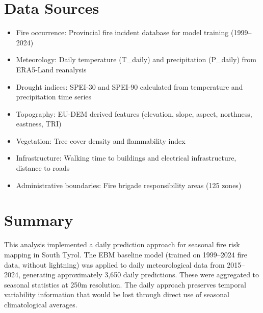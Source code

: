 \documentclass[11pt,a4paper]{article}
\begin{document}
\section{Data Sources}

\begin{itemize}
    \item Fire occurrence: Provincial fire incident database for model training (1999--2024)
    \item Meteorology: Daily temperature (T\_daily) and precipitation (P\_daily) from ERA5-Land reanalysis
    \item Drought indices: SPEI-30 and SPEI-90 calculated from temperature and precipitation time series
    \item Topography: EU-DEM derived features (elevation, slope, aspect, northness, eastness, TRI)
    \item Vegetation: Tree cover density and flammability index
    \item Infrastructure: Walking time to buildings and electrical infrastructure, distance to roads
    \item Administrative boundaries: Fire brigade responsibility areas (125 zones)
\end{itemize}

\section{Summary}

This analysis implemented a daily prediction approach for seasonal fire risk mapping in South Tyrol. The EBM baseline model (trained on 1999--2024 fire data, without lightning) was applied to daily meteorological data from 2015--2024, generating approximately 3,650 daily predictions. These were aggregated to seasonal statistics at 250m resolution. The daily approach preserves temporal variability information that would be lost through direct use of seasonal climatological averages.
\end{document}
